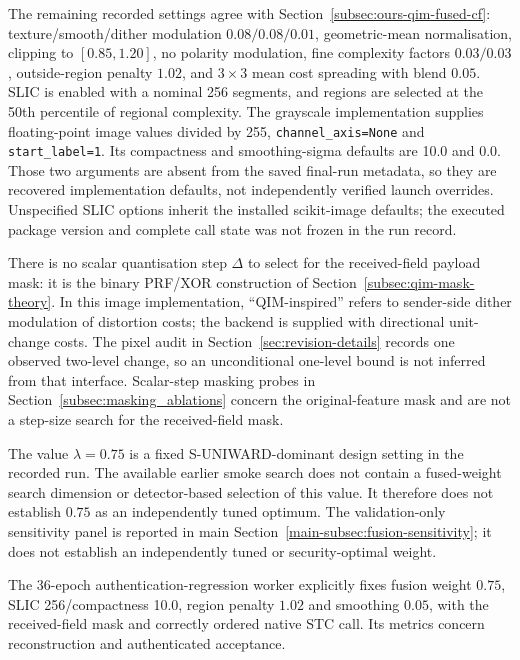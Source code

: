 \documentclass[journal]{IEEEtran}
\theoremstyle{definition}
\theoremstyle{game}
\begin{document}
The remaining recorded settings agree with
Section~\ref{subsec:ours-qim-fused-cf}: texture/smooth/dither modulation
$0.08/0.08/0.01$, geometric-mean normalisation, clipping to
$[0.85,1.20]$, no polarity modulation, fine complexity factors
$0.03/0.03$, outside-region penalty $1.02$, and $3\times3$ mean
cost spreading with blend $0.05$. SLIC is enabled with a nominal 256
segments, and regions are selected at the 50th percentile of regional
complexity. The grayscale implementation supplies floating-point
image values divided by 255, \texttt{channel\_axis=None} and
\texttt{start\_label=1}. Its compactness and smoothing-sigma defaults
are 10.0 and 0.0. Those two arguments are absent from the saved final-run
metadata, so they are recovered implementation defaults, not independently
verified launch overrides. Unspecified SLIC options inherit the installed
scikit-image defaults; the executed package version and complete call state
was not frozen in the run record.

There is no scalar quantisation step $\Delta$ to select for the received-field
payload mask: it is the binary PRF/XOR construction of
Section~\ref{subsec:qim-mask-theory}. In this image implementation,
``QIM-inspired'' refers to sender-side dither modulation of distortion
costs; the backend is supplied with directional unit-change costs. The
pixel audit in Section~\ref{sec:revision-details} records one
observed two-level change, so an unconditional one-level bound is not
inferred from that interface. Scalar-step masking probes in
Section~\ref{subsec:masking_ablations} concern the original-feature mask and are not a step-size search for the
received-field mask.

The value $\lambda=0.75$ is a fixed S-UNIWARD-dominant design setting
in the recorded run. The available earlier smoke search does not contain
a fused-weight search dimension or detector-based selection of this value.
It therefore does not establish $0.75$ as an independently tuned optimum.
The validation-only sensitivity panel is reported in main
Section~\ref{main-subsec:fusion-sensitivity}; it does not establish
an independently tuned or security-optimal weight.

The 36-epoch authentication-regression worker explicitly fixes fusion weight $0.75$,
SLIC 256/compactness 10.0, region penalty $1.02$ and smoothing $0.05$,
with the received-field mask and correctly ordered native STC call.
Its metrics concern reconstruction and authenticated acceptance.
\end{document}
